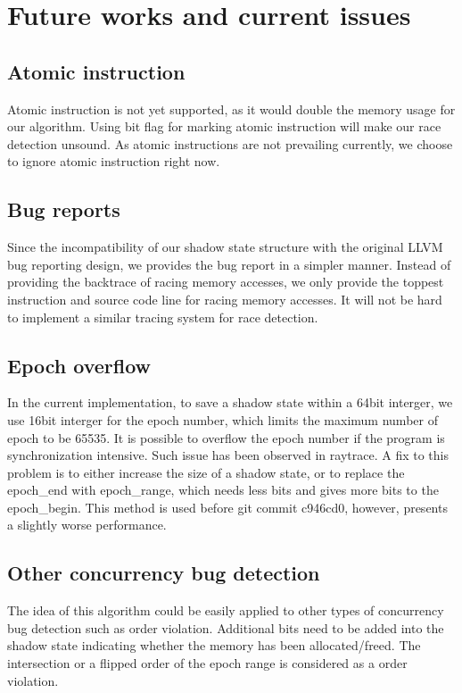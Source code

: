 \section{Future works and current issues}
\subsection{Atomic instruction}
Atomic instruction is not yet supported, as it would double the memory usage for our algorithm. Using bit flag for marking atomic instruction
will make our race detection unsound. As atomic instructions are not prevailing 
currently, we choose to ignore atomic instruction right now.
\subsection{Bug reports}
Since the incompatibility of our shadow state structure with the original LLVM bug reporting design, we provides the bug report in a simpler
manner. Instead of providing the backtrace of racing memory accesses, we only provide the toppest instruction and source code line for racing memory accesses.
It will not be hard to implement a similar tracing system for race detection.
\subsection{Epoch overflow}
In the current implementation, to save a shadow state within a 64bit interger, we use 16bit interger for the epoch number, which limits the maximum number of epoch
to be 65535. It is possible to overflow the epoch number if the program is synchronization intensive. Such issue has been observed in raytrace. A fix to this problem
is to either increase the size of a shadow state, or to replace the epoch\_end with epoch\_range, which needs less bits and gives more bits to the epoch\_begin. This method
is used before git commit c946cd0, however, presents a slightly worse performance.
\subsection{Other concurrency bug detection}
The idea of this algorithm could be easily applied to other types of concurrency bug detection such as order violation. Additional bits need to be added into the shadow
state indicating whether the memory has been allocated/freed. The intersection or a flipped order of the epoch range is considered as a order violation.
